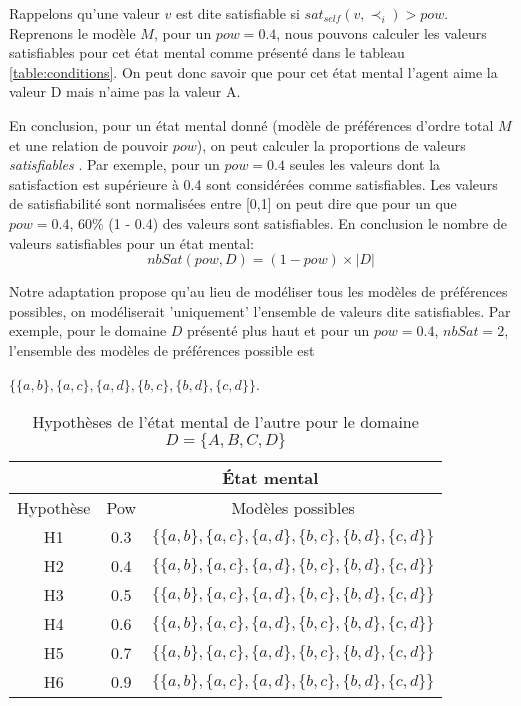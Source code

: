 \documentclass{llncs}
\begin{document}
	Rappelons qu'une valeur $v$ est dite satisfiable si $ sat_{self}(v, \prec_i) > pow$. Reprenons le modèle $M$, pour un $pow =0.4$, nous pouvons calculer les valeurs satisfiables pour cet état mental comme présenté dans le tableau \ref{table:conditions}. On peut donc savoir que pour cet état mental l'agent aime la valeur D mais n'aime pas la valeur A.
	
	En conclusion, pour un état mental donné (modèle de préférences d'ordre total $M$  et une relation de pouvoir $pow$), on peut calculer la proportions de valeurs \emph{satisfiables} . Par exemple, pour un $pow =0.4$ seules les valeurs dont la satisfaction est supérieure à 0.4 sont considérées comme satisfiables. 
	Les valeurs de satisfiabilité sont normalisées entre [0,1] on peut dire que pour un que $pow =0.4$, 60\% (1 - 0.4) des valeurs sont satisfiables. En conclusion le nombre de valeurs satisfiables pour un état mental: 
			\begin{equation}
			nbSat(pow, D)= (1-pow) \times |D|
			\end{equation}
	
	Notre adaptation propose qu'au lieu de modéliser tous les modèles de préférences possibles, on modéliserait 'uniquement' l'ensemble de valeurs dite satisfiables. Par exemple, pour le domaine $D$ présenté plus haut et pour un $pow =0.4$, $nbSat =2$, l'ensemble des modèles de préférences possible est 
	
	$\{ \{a,b\}, \{a,c\}, \{a,d\}, \{b,c\}, \{b,d\}, \{c,d\} \}$.
	
			\begin{table}[h]
				\centering
				\begin{tabular}{ |c|c|c| }
					\hline
					 & \multicolumn{2}{c|}{État mental}  \\
					\hline
					Hypothèse & Pow & Modèles possibles \\
					\hline
					H1&0.3&$\{ \{a,b\}, \{a,c\}, \{a,d\}, \{b,c\}, \{b,d\}, \{c,d\} \}$ \\
					\hline
					H2&0.4&$\{ \{a,b\}, \{a,c\}, \{a,d\}, \{b,c\}, \{b,d\}, \{c,d\} \}$ \\
					\hline
					H3&0.5&$\{ \{a,b\}, \{a,c\}, \{a,d\}, \{b,c\}, \{b,d\}, \{c,d\} \}$\\
					\hline
					H4&0.6&$\{ \{a,b\}, \{a,c\}, \{a,d\}, \{b,c\}, \{b,d\}, \{c,d\} \}$ \\
					\hline
					H5&0.7&$\{ \{a,b\}, \{a,c\}, \{a,d\}, \{b,c\}, \{b,d\}, \{c,d\} \}$\\
				\hline
					H6&0.9&$\{ \{a,b\}, \{a,c\}, \{a,d\}, \{b,c\}, \{b,d\}, \{c,d\} \}$ \\
					\hline
				\end{tabular}
				\caption{Hypothèses de l'état mental de l'autre pour le domaine $D=\{A, B, C, D\}$}
				\label{table:poss}
			\end{table}
	
\end{document}
